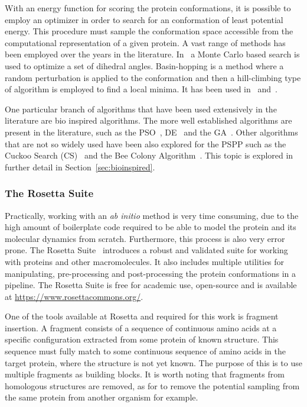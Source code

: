 With an energy function for scoring the protein conformations, it is possible
to employ an optimizer in order to search for an conformation of least
potential energy. This procedure must sample the conformation space accessible
from the computational representation of a given protein. A vast range of
methods has been employed over the years in the literature.
In~\cite{li1987monte} a Monte Carlo based search is used to optimize a set of
dihedral angles. Basin-hopping is a method where a random perturbation is
applied to the conformation and then a hill-climbing type of algorithm is
employed to find a local minima. It has been used in~\cite{prentiss2008protein}
and~\cite{olson2012efficient}.

One particular branch of algorithms that have been used extensively in the
literature are bio inspired algorithms. The more well established algorithms
are present in the literature, such as the \ac{PSO}~\cite{geng2017protein},
\ac{DE}~\cite{hao2017conformational} and the \ac{GA}~\cite{higgs2010genetic}.
Other algorithms that are not so widely used have been also explored for the
\ac{PSPP} such as the Cuckoo Search (CS)~\cite{ramyachitra2017modcsa} and the
Bee Colony Algorithm~\cite{li2015balance}. This topic is explored in further
detail in Section~\ref{sec:bioinspired}.

\subsubsection{The Rosetta Suite} \label{sec:rosetta}

Practically, working with an \textit{ab initio} method is very time consuming,
due to the high amount of boilerplate code required to be able to model the
protein and its molecular dynamics from scratch. Furthermore, this process is
also very error prone. The Rosetta Suite~\cite{rohl2004protein} introduces a
robust and validated suite for working with proteins and other macromolecules.
It also includes multiple utilities for manipulating, pre-processing and
post-processing the protein conformations in a pipeline. The Rosetta Suite is
free for academic use, open-source and is available at
\url{https://www.rosettacommons.org/}.

One of the tools available at Rosetta and required for this work is fragment
insertion. A fragment consists of a sequence of continuous amino acids at a
specific configuration extracted from some protein of known structure. This
sequence must fully match to some continuous sequence of amino acids in the
target protein, where the structure is not yet known. The purpose of this is to
use multiple fragments as building blocks. It is worth noting that fragments
from homologous structures are removed, as for to remove the potential sampling
from the same protein from another organism for example.

